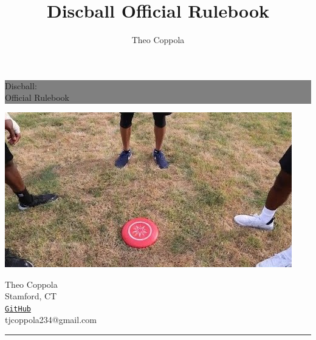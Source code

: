 \documentclass[10pt]{article}
\title{Discball Official Rulebook}
\author{Theo Coppola}
\begin{document}
\begin{titlepage} %

    \colorbox{grey}{
        \parbox[t]{0.93\textwidth}{ %
            \parbox[t]{0.91\textwidth}{ %
                \raggedleft%
                \fontsize{50pt}{80pt}\selectfont %
                \vspace{0.7cm} %

                Discball:\\
                Official Rulebook\\

                \vspace{0.7cm} %
            }
        }
    }

    \vfill

    \begin{center}
        \includegraphics{title_image}
    \end{center}

    \vfill %

    \parbox[t]{0.93\textwidth}{ %
        \raggedleft%
        \large%
        {\Large Theo Coppola}\\[4pt] %
        Stamford, CT\\[4pt] %
        \texttt{\href{https://github.com/tjcoppola234/Discball}{GitHub}}\\[4pt]
        tjcoppola234@gmail.com

        \hfill\rule{0.2\linewidth}{1pt}%
    }

\end{titlepage}
\end{document}
